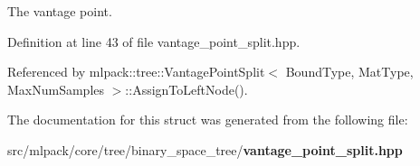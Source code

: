 The vantage point. 



Definition at line 43 of file vantage\+\_\+point\+\_\+split.\+hpp.



Referenced by mlpack\+::tree\+::\+Vantage\+Point\+Split$<$ Bound\+Type, Mat\+Type, Max\+Num\+Samples $>$\+::\+Assign\+To\+Left\+Node().



The documentation for this struct was generated from the following file\+:\begin{DoxyCompactItemize}
\item 
src/mlpack/core/tree/binary\+\_\+space\+\_\+tree/{\bf vantage\+\_\+point\+\_\+split.\+hpp}\end{DoxyCompactItemize}
